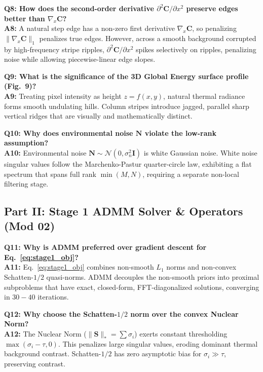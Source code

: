 \documentclass[10pt,conference]{IEEEtran}
\begin{document}
\vspace{0.4em}\noindent\textbf{Q8: How does the second-order derivative $\partial^2 \mathbf{C} / \partial x^2$ preserve edges better than $\nabla_x \mathbf{C}$?}\\
\textbf{A8:} A natural step edge has a non-zero first derivative $\nabla_x \mathbf{C}$, so penalizing $\|\nabla_x \mathbf{C}\|_1$ penalizes true edges. However, across a smooth background corrupted by high-frequency stripe ripples, $\partial^2 \mathbf{C}/\partial x^2$ spikes selectively on ripples, penalizing noise while allowing piecewise-linear edge slopes.

\vspace{0.4em}\noindent\textbf{Q9: What is the significance of the 3D Global Energy surface profile (Fig.~9)?}\\
\textbf{A9:} Treating pixel intensity as height $z = f(x, y)$, natural thermal radiance forms smooth undulating hills. Column stripes introduce jagged, parallel sharp vertical ridges that are visually and mathematically distinct.

\vspace{0.4em}\noindent\textbf{Q10: Why does environmental noise $\mathbf{N}$ violate the low-rank assumption?}\\
\textbf{A10:} Environmental noise $\mathbf{N} \sim \mathcal{N}(0, \sigma_n^2 \mathbf{I})$ is white Gaussian noise. White noise singular values follow the Marchenko-Pastur quarter-circle law, exhibiting a flat spectrum that spans full rank $\min(M, N)$, requiring a separate non-local filtering stage.

\subsection{Part II: Stage 1 ADMM Solver \& Operators (Mod 02)}

\noindent\textbf{Q11: Why is ADMM preferred over gradient descent for Eq.~\ref{eq:stage1_obj}?}\\
\textbf{A11:} Eq.~\ref{eq:stage1_obj} combines non-smooth $L_1$ norms and non-convex Schatten-$1/2$ quasi-norms. ADMM decouples the non-smooth priors into proximal subproblems that have exact, closed-form, FFT-diagonalized solutions, converging in $30-40$ iterations.

\vspace{0.4em}\noindent\textbf{Q12: Why choose the Schatten-$1/2$ norm over the convex Nuclear Norm?}\\
\textbf{A12:} The Nuclear Norm ($\|\mathbf{S}\|_* = \sum \sigma_i$) exerts constant thresholding $\max(\sigma_i - \tau, 0)$. This penalizes large singular values, eroding dominant thermal background contrast. Schatten-$1/2$ has zero asymptotic bias for $\sigma_i \gg \tau$, preserving contrast.
\end{document}

